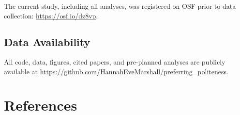 \documentclass[
  english,
  man,floatsintext]{apa6}
\begin{document}
The current study, including all analyses, was registered on OSF prior to data collection: \url{https://osf.io/dz8vp}.

\hypertarget{data-availability}{%
\subsection{Data Availability}\label{data-availability}}

All code, data, figures, cited papers, and pre-planned analyses are publicly available at \url{https://github.com/HannahEveMarshall/preferring_politeness}.

\newpage

\hypertarget{references}{%
\section{References}\label{references}}

\begingroup
\setlength{\parindent}{-0.5in}
\setlength{\leftskip}{0.5in}
\end{document}
